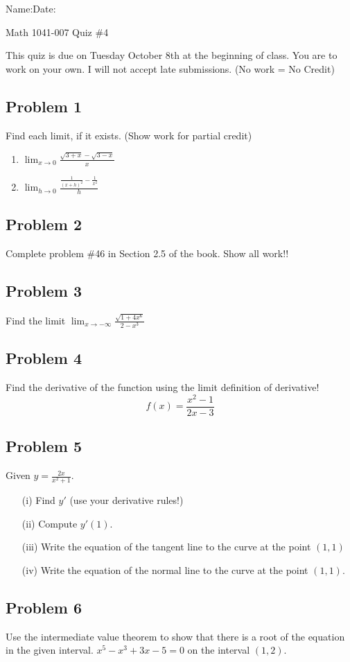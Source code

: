 \documentclass[10pt]{book}
\theoremstyle{definition}
\begin{document}
\begin{flushleft}
Name:\underline{\hspace{13cm}}Date:\underline{\hspace{2cm}}
\end{flushleft}
\begin{center}
{\Large Math 1041-007 \hspace{0.5cm} Quiz \#4}
\end{center}
This quiz is due on Tuesday October 8th at the beginning of class. You are to work on your own. I will not accept late submissions. (No work = No Credit)
\vspace{0.2 cm}
\subsection*{Problem 1}Find each limit, if it exists. (Show work for partial credit)
\begin{enumerate}[label=(\alph*)]
    \item $\displaystyle\lim_{x\rightarrow 0}\frac{\sqrt{3+x}-\sqrt{3-x}}{x}$\vspace{4cm}
    \item $\displaystyle \lim_{h\rightarrow 0}\frac{\frac{1}{(x+h)^2}-\frac{1}{x^2}}{h}$\vspace{4cm}
\end{enumerate}
\subsection*{Problem 2} Complete problem \#46 in Section 2.5 of the book. Show all work!!
\clearpage
\subsection*{Problem 3} Find the limit $\displaystyle\lim_{x\rightarrow -\infty}\frac{\sqrt{1+4x^6}}{2-x^3}$
\vspace{7cm}
\subsection*{Problem 4}
Find the derivative of the function using the limit definition of derivative!
\[
f(x)=\frac{x^2-1}{2x-3}
\]
\clearpage
\subsection*{Problem 5}
Given $y=\frac{2x}{x^2+1}$.
\begin{itemize}
    \item[(i)] Find $y'$ (use your derivative rules!)\vspace{2.5cm}
    \item[(ii)] Compute $y'(1)$.\vspace{2.5cm}
    \item[(iii)] Write the equation of the tangent line to the curve at the point $(1,1)$\vspace{2.5cm}
    \item[(iv)] Write the equation of the normal line to the curve at the point $(1,1)$.\vspace{2.5cm}
\end{itemize}
\subsection*{Problem 6}
Use the intermediate value theorem to show that there is a root of the equation in the given interval. $x^5-x^3+3x-5=0$ on the interval $(1,2)$.
\end{document}

